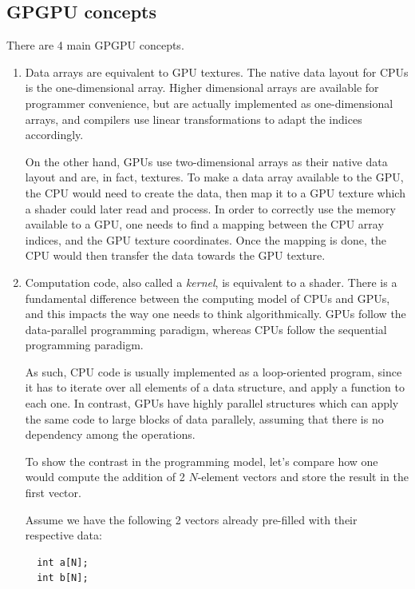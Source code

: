 \documentclass[10pt, a4paper]{report}
\begin{document}
\subsection{GPGPU concepts}
There are 4 main GPGPU concepts.

\begin{enumerate}
\item Data arrays are equivalent to GPU textures.
The native data layout for CPUs is the one-dimensional array.
Higher dimensional arrays are available for programmer convenience, but are
actually implemented as one-dimensional arrays, and compilers use linear
transformations to adapt the indices accordingly.

On the other hand, GPUs use two-dimensional arrays as their native data layout
and are, in fact, textures.
To make a data array available to the GPU, the CPU would need to create the
data, then map it to a GPU texture which a shader could later read and process.
In order to correctly use the memory available to a GPU, one needs to find a
mapping between the CPU array indices, and the GPU texture coordinates.
Once the mapping is done, the CPU would then transfer the data towards the GPU
texture.

\item Computation code, also called a \emph{kernel}, is equivalent to a shader.
There is a fundamental difference between the computing model of CPUs and GPUs,
and this impacts the way one needs to think algorithmically.
GPUs follow the data-parallel programming paradigm, whereas CPUs follow the
sequential programming paradigm.

As such, CPU code is usually implemented as a loop-oriented program, since it
has to iterate over all elements of a data structure, and apply a function to
each one.
In contrast, GPUs have highly parallel structures which can apply the same code
to large blocks of data parallely, assuming that there is no dependency among
the operations.

To show the contrast in the programming model, let's compare how one would
compute the addition of 2 $N$-element vectors and store the result in the first
vector.

Assume we have the following 2 vectors already pre-filled with their respective
data:

\begin{lstlisting}
  int a[N];
  int b[N];
\end{lstlisting}


\end{enumerate}
\end{document}
